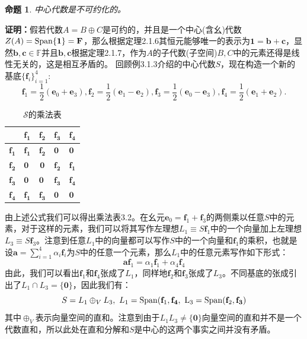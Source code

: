 \documentclass[mathserif,hyperref,UTF8,openany,b5paper]{ctexbook}
\newtheorem{pro}{命题}[section]
\begin{document}
\begin{pro}
    中心代数是不可约化的。
\end{pro}
\textbf{证明：}假若代数$A=B\oplus C$是可约的，并且是一个中心(含幺)代数$Z(A)=\rm{Span}\{\mathbf{1}\}=\mathbf{F}$，那么根据定理2.1.6其恒元能够唯一的表示为$\mathbf{1}=\mathbf{b}+\mathbf{c}$，显然$\mathbf{b,c}\in\mathbb{F}$并且$\mathbf{b,c}$根据定理2.1.7，作为$A$的子代数(子空间)$B,C$中的元素还得是线性无关的，这是相互矛盾的。
回顾例3.1.3介绍的中心代数$S$，现在构造一个新的基底$\{\mathbf{f}_i\}^{4}_{i=1}$:
\begin{equation}
    \mathbf{f}_1=\frac{1}{2}(\mathbf{e}_0+\mathbf{e}_3),\mathbf{f}_2=\frac{1}{2}(\mathbf{e}_1-\mathbf{e}_2),\mathbf{f}_3=\frac{1}{2}(\mathbf{e}_0-\mathbf{e}_3),\mathbf{f}_4=\frac{1}{2}(\mathbf{e}_1+\mathbf{e}_2).
\end{equation}
\begin{table}  
    \centering  
    \begin{tabular}{@{}c|lcll@{}}
    \toprule
     & $\mathbf{f_1}$ & $\mathbf{f_2}$ & $\mathbf{f_3}$ & $\mathbf{f_4}$ \\ \midrule
    $\mathbf{f_1}$ & $\mathbf{f_1}$ & $\mathbf{f_2}$ & $\mathbf{0}$ & $\mathbf{0}$ \\
    $\mathbf{f_2}$ & $\mathbf{0}$ & $\mathbf{0}$ & $\mathbf{f_2}$ & $\mathbf{f_1}$ \\
    \multicolumn{1}{l|}{$\mathbf{f_3}$} & $\mathbf{0}$ & \multicolumn{1}{l}{$\mathbf{0}$} & $\mathbf{f_3}$ & $\mathbf{f_4}$ \\
    \multicolumn{1}{l|}{$\mathbf{f_4}$} & $\mathbf{f_1}$ &\multicolumn{1}{l}{$\mathbf{f_3}$} & $\mathbf{0}$ & $\mathbf{0}$ \\ \bottomrule
    \end{tabular}
    \caption{$\mathcal{S}$的乘法表}
\end{table} 

由上述公式我们可以得出乘法表3.2。在幺元$\mathbf{e}_0=\mathbf{f}_1+\mathbf{f}_3$的两侧乘以任意$S$中的元素，对于这样的元素，我们可以将其写作左理想$L_1\equiv S\mathbf{f}_1$中的一个向量加上左理想$L_3\equiv S\mathbf{f}_3$。注意到任意$L_1$中的向量都可以写作$S$中的一个向量和$\mathbf{f}_1$的乘积，也就是设$\mathbf{a}=\sum_{i=1}^4\alpha_i\mathbf{f}_i$为$S$中的任意一个元素，那么$L_1$中的任意元素写作如下形式：
\begin{equation}
    \mathbf{af}_1=\alpha_1\mathbf{f}_1+\alpha_4\mathbf{f}_4
\end{equation}
由此，我们可以看出$\mathbf{f}_1$和$\mathbf{f}_4$张成了$L_1$，同样地$\mathbf{f}_2$和$\mathbf{f}_3$张成了$L_3$。不同基底的张成引出了$L_1\cap L_3=\{\mathbf{0}\}$，因此我们有：
\begin{equation}
    S = L_1\oplus_V L_3, \ L_1 = \rm{Span}(\mathbf{f}_1,\mathbf{f_4},\ L_3 = \rm{Span}(\mathbf{f}_2,\mathbf{f_3})
\end{equation}
其中$\oplus_V$表示向量空间的直和。注意到由于$L_1 L_3\neq \{\mathbf{0}\}$向量空间的直和并不是一个代数直和，所以此处在直和分解和$S$是中心的这两个事实之间并没有矛盾。
\end{document}
